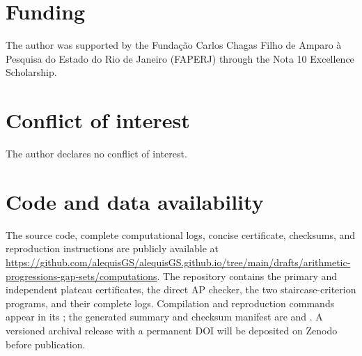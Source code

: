\documentclass[11pt]{article}
\theoremstyle{plain}
\theoremstyle{definition}
\theoremstyle{remark}
\begin{document}
\section*{Funding}

The author was supported by the Fundação Carlos Chagas Filho de Amparo à Pesquisa
do Estado do Rio de Janeiro (FAPERJ) through the Nota 10 Excellence Scholarship.

\section*{Conflict of interest}

The author declares no conflict of interest.

\section*{Code and data availability}

The source code, complete computational logs, concise certificate, checksums,
and reproduction instructions are publicly available at
\url{https://github.com/alequisGS/alequisGS.github.io/tree/main/drafts/arithmetic-progressions-gap-sets/computations}.
The repository contains the primary and independent plateau certificates, the
direct AP checker, the two staircase-criterion programs, and their complete
logs.  Compilation and reproduction commands appear in its
; the generated summary and checksum manifest are
 and .  A versioned archival release
with a permanent DOI will be deposited on Zenodo before publication.


\printbibliography
\end{document}

